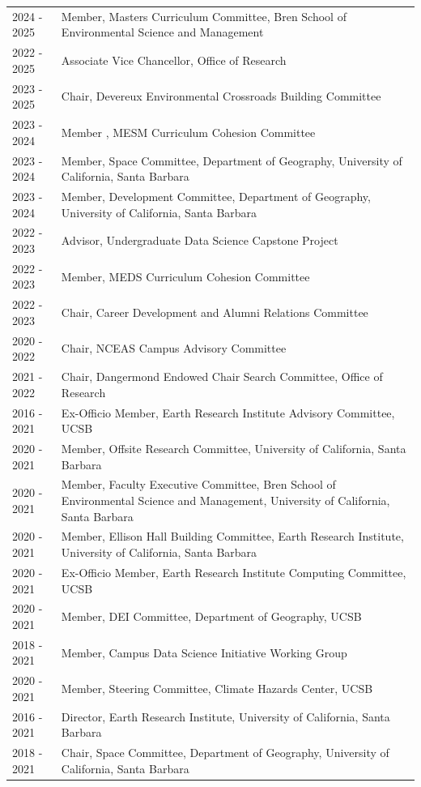 \begin{longtable}{l p{5.5in}}
2024 - 2025 & Member, Masters Curriculum Committee, Bren School of Environmental Science and Management \\
2022 - 2025 & Associate Vice Chancellor, Office of Research \\
2023 - 2025 & Chair, Devereux Environmental Crossroads Building Committee  \\
2023 - 2024 & Member , MESM Curriculum Cohesion Committee \\
2023 - 2024 & Member, Space Committee, Department of Geography, University of California, Santa Barbara \\
2023 - 2024 & Member, Development Committee, Department of Geography, University of California, Santa Barbara \\
2022 - 2023 & Advisor, Undergraduate Data Science Capstone Project \\
2022 - 2023 & Member, MEDS Curriculum Cohesion Committee \\
2022 - 2023 & Chair, Career Development and Alumni Relations Committee \\
2020 - 2022 & Chair, NCEAS Campus Advisory Committee  \\
2021 - 2022 & Chair, Dangermond Endowed Chair Search Committee, Office of Research \\
2016 - 2021 & Ex-Officio Member, Earth Research Institute Advisory Committee, UCSB \\
2020 - 2021 & Member, Offsite Research Committee, University of California, Santa Barbara \\
2020 - 2021 & Member, Faculty Executive Committee, Bren School of Environmental Science and Management, University of California, Santa Barbara \\
2020 - 2021 & Member, Ellison Hall Building Committee, Earth Research Institute, University of California, Santa Barbara \\
2020 - 2021 & Ex-Officio Member, Earth Research Institute Computing Committee, UCSB \\
2020 - 2021 & Member, DEI Committee, Department of Geography, UCSB \\
2018 - 2021 & Member, Campus Data Science Initiative Working Group \\
2020 - 2021 & Member, Steering Committee, Climate Hazards Center, UCSB \\
2016 - 2021 & Director, Earth Research Institute, University of California, Santa Barbara \\
2018 - 2021 & Chair, Space Committee, Department of Geography, University of California, Santa Barbara \\

\end{longtable}
